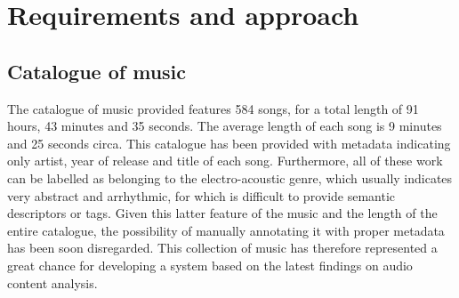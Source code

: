 \chapter{Requirements and approach} 

\label{Chapter4} 


\section{Catalogue of music}
\label{sec:catalogue}
The catalogue of music provided features 584 songs, for a total length of 91 hours, 43 minutes and 35 seconds. The average length of each song is 9 minutes and 25 seconds circa. This catalogue has been provided with metadata indicating only artist, year of release and title of each song. Furthermore, all of these work can be labelled as belonging to the electro-acoustic genre, which usually indicates very abstract and arrhythmic, for which is difficult to provide semantic descriptors or tags. Given this latter feature of the music and the length of the entire catalogue, the possibility of manually annotating it with proper metadata has been soon disregarded. This collection of music has therefore represented a great chance for developing a system based on the latest findings on audio content analysis.

